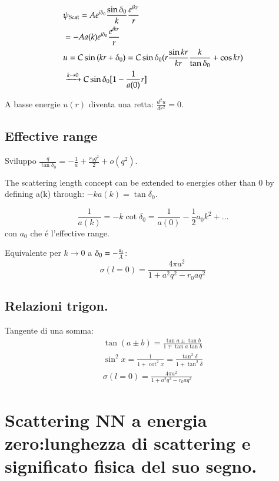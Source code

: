 \documentclass[main.tex]{subfiles}
\begin{document}
\begin{align*}
&\psi_{\text{Scat}}=Ae^{i\delta_0}\frac{\sin{\delta_0}}{k}\frac{e^{ikr}}{r}\\
&=-Aa(k)e^{i\delta_0}\frac{e^{ikr}}{r}\\
&u=C\sin{(kr+\delta_0)}=C\sin{\delta_0}(r\frac{\sin{kr}}{kr}\frac{k}{\tan{\delta_0}}+\cos{kr})\\
&\xrightarrow{k\rightarrow0}C\sin{\delta_0[1-\frac{1}{a(0)}r]}
\end{align*}


A basse energie $u(r)$ diventa una retta: $\frac{d^2u}{dr^2}=0$.

\subsection{Effective range}
Sviluppo  $\frac{q}{\tan{\delta_0}}=-\frac{1}{a}+\frac{r_0q^2}{2}+o(q^2)$.

The scattering length concept can be extended to energies other than 0 by defining a(k) through: $-ka(k)=\tan{\delta_0}$.

\begin{equation*}
\frac{1}{a(k)}=-k\cot{\delta_0}=\frac{1}{a(0)}-\frac{1}{2}a_0k^2+\ldots
\end{equation*}
 con $a_0$ che \'e l'effective range.

Equivalente per $k\rightarrow0$ a $\delta_0=-\frac{a_t}{\lambdabar}$:
\begin{equation*}
\sigma(l=0)=\frac{4\pi a^2}{1+a^2q^2-r_0aq^2}
\end{equation*}

\subsection{Relazioni trigon.}

Tangente di una somma:
\begin{align*}
\tan{(a\pm b)}=\frac{\tan{a}\pm\tan{b}}{1\mp\tan{a}\tan{b}}\\
\sin^2x=\frac{1}{1+\cot^2x}=\frac{\tan^2\delta}{1+\tan^2\delta}\\
\sigma(l=0)=\frac{4\pi a^2}{1+a^2q^2-r_0aq^2}
\end{align*}

\section{Scattering NN a energia zero:lunghezza di scattering e significato fisica del suo segno.}
\end{document}

